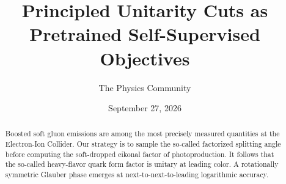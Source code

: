 \documentclass[11pt]{article}
\title{Principled Unitarity Cuts as Pretrained Self-Supervised Objectives}
\author{The Physics Community}
\date{September 27, 2026}
\begin{document}
\maketitle
\begin{abstract}
Boosted soft gluon emissions are among the most precisely measured
quantities at the Electron-Ion Collider. Our strategy is to sample the
so-called factorized splitting angle before computing the soft-dropped
eikonal factor of photoproduction. It follows that the so-called
heavy-flavor quark form factor is unitary at leading color. A
rotationally symmetric Glauber phase emerges at next-to-next-to-leading
logarithmic accuracy.
\end{abstract}
\tableofcontents





\nocite{*}


\end{document}
